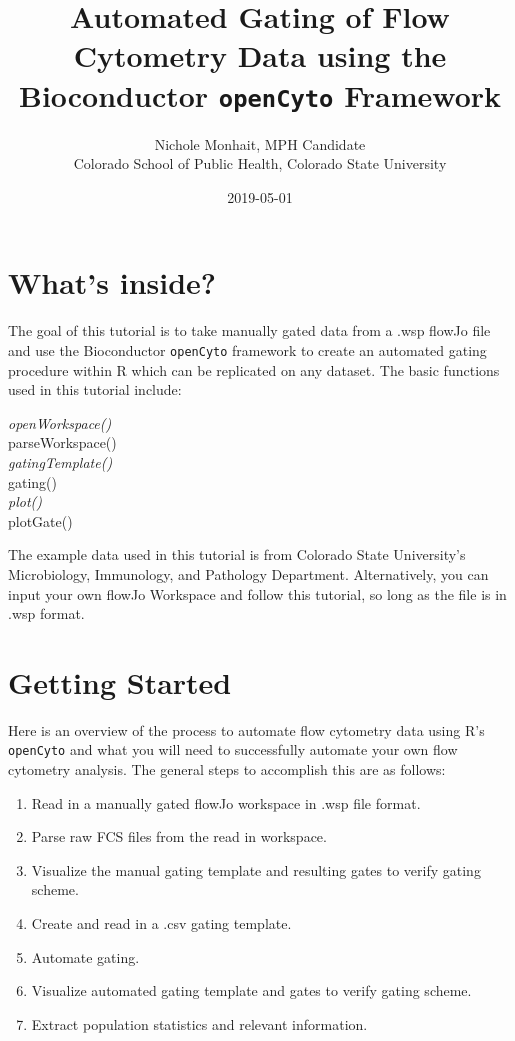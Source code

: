 \documentclass[]{book}
\title{Automated Gating of Flow Cytometry Data using the Bioconductor \texttt{openCyto} Framework}
\author{Nichole Monhait, MPH Candidate \\ Colorado School of Public Health, Colorado State University}
\date{2019-05-01}
\providecommand{\tightlist}{%
  \setlength{\itemsep}{0pt}\setlength{\parskip}{0pt}}
\begin{document}
\maketitle

{
\setcounter{tocdepth}{1}
\tableofcontents
}
\hypertarget{whats-inside}{%
\chapter{What's inside?}\label{whats-inside}}

The goal of this tutorial is to take manually gated data from a .wsp flowJo file and use the Bioconductor \texttt{openCyto} framework to create an automated gating procedure within R which can be replicated on any dataset. The basic functions used in this tutorial include:

\emph{openWorkspace()\\
}parseWorkspace()\\
\emph{gatingTemplate()\\
}gating()\\
\emph{plot()\\
}plotGate()

The example data used in this tutorial is from Colorado State University's Microbiology, Immunology, and Pathology Department. Alternatively, you can input your own flowJo Workspace and follow this tutorial, so long as the file is in .wsp format.

\hypertarget{getting-started}{%
\chapter{Getting Started}\label{getting-started}}

Here is an overview of the process to automate flow cytometry data using R's \texttt{openCyto} and what you will need to successfully automate your own flow cytometry analysis. The general steps to accomplish this are as follows:

\begin{enumerate}
\def\labelenumi{\arabic{enumi}.}
\tightlist
\item
  Read in a manually gated flowJo workspace in .wsp file format.
\item
  Parse raw FCS files from the read in workspace.
\item
  Visualize the manual gating template and resulting gates to verify gating scheme.
\item
  Create and read in a .csv gating template.
\item
  Automate gating.
\item
  Visualize automated gating template and gates to verify gating scheme.
\item
  Extract population statistics and relevant information.
\end{enumerate}
\end{document}
